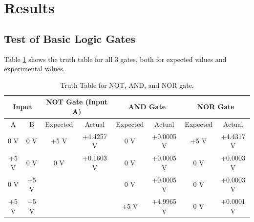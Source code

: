 \documentclass{report}
\begin{document}
\newpage
\section{Results}
	\subsection{Test of Basic Logic Gates}
	Table \ref{section1} shows the truth table for all 3 gates, both for expected values and experimental values.
	\begin{table}[h]
		\centering
		\begin{tabular}{@{}cc|cc|cc|cc@{}}
			\toprule
			\multicolumn{2}{c|}{Input} & \multicolumn{2}{c|}{NOT Gate (Input A)}                                                           & \multicolumn{2}{c|}{AND Gate} & \multicolumn{2}{c}{NOR Gate} \\ \midrule
			A            & B           & Expected                                        & Actual                                          & Expected      & Actual        & Expected     & Actual        \\ \midrule
			0 V          & 0 V         & +5 V                                            & +4.4257 V                                       & 0 V           & +0.0005 V     & +5 V         & +4.4317 V     \\
			+5 V         & 0 V         & 0 V                                             & +0.1603 V                                       & 0 V           & +0.0005 V     & 0 V          & +0.0003 V     \\
			0 V          & +5 V        & \cellcolor[HTML]{000000}{\color[HTML]{000000} } & \cellcolor[HTML]{000000}{\color[HTML]{000000} } & 0 V           & +0.0005 V     & 0 V          & +0.0003 V     \\
			+5 V         & +5 V        & \cellcolor[HTML]{000000}{\color[HTML]{000000} } & \cellcolor[HTML]{000000}{\color[HTML]{000000} } & +5 V          & +4.9965 V     & 0 V          & +0.0001 V     \\ \bottomrule
		\end{tabular}
		\caption{Truth Table for NOT, AND, and NOR gate.}
		\label{section1}
	\end{table}
\end{document}
